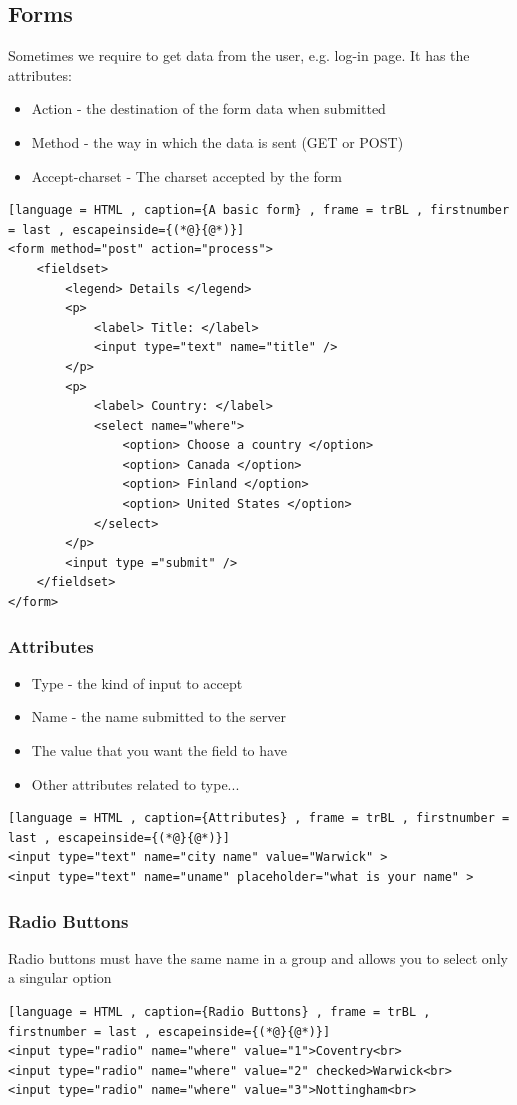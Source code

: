 \documentclass[a4paper]{article}
\theoremstyle{plain}
\theoremstyle{definition}
\theoremstyle{remark}
\begin{document}
\begin{flushleft}
\subsection{Forms}
Sometimes we require to get data from the user, e.g. log-in page. It has the attributes:	
\begin{itemize}
	\item Action - the destination of the form data when submitted
	\item Method - the way in which the data is sent (GET or POST)
	\item Accept-charset - The charset accepted by the form
\end{itemize}
\begin{lstlisting}[language = HTML , caption={A basic form} , frame = trBL , firstnumber = last , escapeinside={(*@}{@*)}]
<form method="post" action="process">
	<fieldset>
		<legend> Details </legend>
		<p>
			<label> Title: </label>
			<input type="text" name="title" />
		</p>
		<p>
			<label> Country: </label>
			<select name="where">
				<option> Choose a country </option>
				<option> Canada </option>
				<option> Finland </option>
				<option> United States </option>
			</select>
		</p>
		<input type ="submit" />
	</fieldset>
</form>
\end{lstlisting}
\subsubsection{Attributes}
\begin{itemize}
	\item Type - the kind of input to accept
	\item Name - the name submitted to the server
	\item The value that you want the field to have
	\item Other attributes related to type...
\end{itemize}
\begin{lstlisting}[language = HTML , caption={Attributes} , frame = trBL , firstnumber = last , escapeinside={(*@}{@*)}]
<input type="text" name="city name" value="Warwick" >
<input type="text" name="uname" placeholder="what is your name" >
\end{lstlisting}
\subsubsection{Radio Buttons}
Radio buttons must have the same name in a group and allows you to select only a singular option
\begin{lstlisting}[language = HTML , caption={Radio Buttons} , frame = trBL , firstnumber = last , escapeinside={(*@}{@*)}]
<input type="radio" name="where" value="1">Coventry<br>
<input type="radio" name="where" value="2" checked>Warwick<br>
<input type="radio" name="where" value="3">Nottingham<br>
\end{lstlisting}

\end{flushleft}
\end{document}
